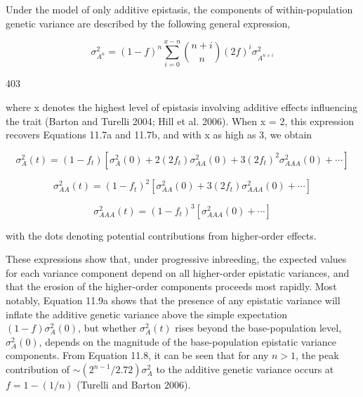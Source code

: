 \documentclass{article}
\begin{document}
Under the model of only additive epistasis, the components of within-population genetic variance are described by the following general expression,

\begin{equation}
\sigma_{A^{n}}^{2}=(1-f)^{n}\sum_{i=0}^{x-n}\binom{n+i}{n}(2f)^{i}\sigma_{A^{n+i}}^{2}
\tag{11.8}
\label{eq:11_8}
\end{equation}

403

where x denotes the highest level of epistasis involving additive effects influencing the trait (Barton and Turelli 2004; Hill et al. 2006). When x = 2, this expression recovers Equations 11.7a and 11.7b, and with x as high as 3, we obtain

\begin{equation}
\sigma_{A}^{2}(t)=(1-f_{t})[\sigma_{A}^{2}(0)+2(2f_{t})\sigma_{A A}^{2}(0)+3(2f_{t})^{2}\sigma_{A A A}^{2}(0)+\cdots]
\tag{11.9a}
\label{eq:11_9a}
\end{equation}

\begin{equation}
\sigma_{A A}^{2}(t)=(1-f_{t})^{2}[\sigma_{A A}^{2}(0)+3(2f_{t})\sigma_{A A A}^{2}(0)+\cdots]
\tag{11.9b}
\label{eq:11_9b}
\end{equation}

\begin{equation}
\sigma_{A A A}^{2}(t)=(1-f_{t})^{3}[\sigma_{A A A}^{2}(0)+\cdots]
\tag{11.9c}
\label{eq:11_9c}
\end{equation}

with the dots denoting potential contributions from higher-order effects.

These expressions show that, under progressive inbreeding, the expected values for each variance component depend on all higher-order epistatic variances, and that the erosion of the higher-order components proceeds most rapidly. Most notably, Equation 11.9a shows that the presence of any epistatic variance will inflate the additive genetic variance above the simple expectation  $ (1 - f)\sigma_A^2(0) $, but whether  $ \sigma_A^2(t) $ rises beyond the base-population level,  $ \sigma_A^2(0) $, depends on the magnitude of the base-population epistatic variance components. From Equation 11.8, it can be seen that for any  $ n > 1 $, the peak contribution of  $ \sim(2^{n-1}/2.72)\sigma_A^2 $ to the additive genetic variance occurs at  $ f = 1 - (1/n) $ (Turelli and Barton 2006).
\end{document}
